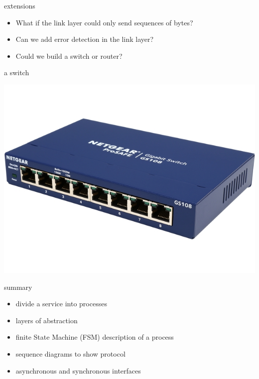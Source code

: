 \begin{frame}{extensions}

\begin{itemize}
  \item What if the link layer could only send sequences of bytes?  \pause
  \item Can we add error detection in the link layer? \pause
  \item Could we build a switch or router? \pause
\end{itemize}

\end{frame}

\begin{frame}{a switch}

\includegraphics[scale=0.4]{switch.jpg}

\end{frame}


\begin{frame}{summary}

\pause
\begin{itemize}
 \item divide a service into processes \pause
 \item layers of abstraction \pause
 \item finite State Machine (FSM) description of a process \pause
 \item sequence diagrams to show protocol \pause
 \item asynchronous and synchronous interfaces \pause
\end{itemize}

\vspace{20pt}{\em .. and hopefully, you have learned about communication stacks}
\end{frame}





